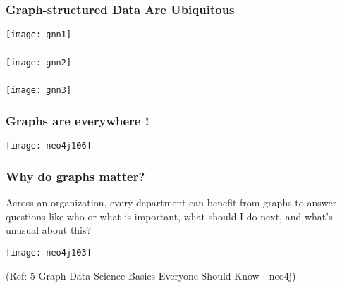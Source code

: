 \begin{frame}[fragile]\frametitle{ Graph-structured Data Are Ubiquitous }

\begin{center}
\texttt{[image: gnn1]}
\end{center}	  

\end{frame}

\begin{frame}[fragile]\frametitle{}

\begin{center}
\texttt{[image: gnn2]}
\end{center}	  

\end{frame}

\begin{frame}[fragile]\frametitle{}

\begin{center}
\texttt{[image: gnn3]}
\end{center}	  

\end{frame}

\begin{frame}[fragile]\frametitle{Graphs are everywhere !}

\begin{center}
\texttt{[image: neo4j106]}
\end{center}	  

\end{frame}

\begin{frame}\frametitle{ Why do graphs matter? }

Across an organization, every department can benefit from graphs to answer questions 
like who or what is important, what should I do next, and what’s unusual about this?

\begin{center}
\texttt{[image: neo4j103]}
\end{center}	  


{\tiny (Ref: 5 Graph Data Science Basics Everyone Should Know - neo4j)}
\end{frame}

